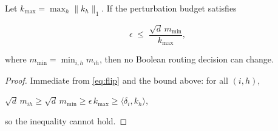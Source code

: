 \begin{theorem}






\label{thm:robustness}






Let $k_{\max}=\max_{h}\|k_{h}\|_1$.  If the perturbation budget satisfies






\[






\epsilon \;\le\; \frac{\sqrt{d}\,m_{\min}}{k_{\max}},






\]






where $m_{\min}=\min_{i,h}m_{ih}$, then no Boolean routing decision can change.






\end{theorem}













\begin{proof}






Immediate from \eqref{eq:flip} and the bound above: for all $(i,h)$,






$\sqrt{d}\,m_{ih}\ge\sqrt{d}\,m_{\min}\ge \epsilon\,k_{\max}\ge \langle\delta_i,k_h\rangle$,






so the inequality cannot hold.






\end{proof}













